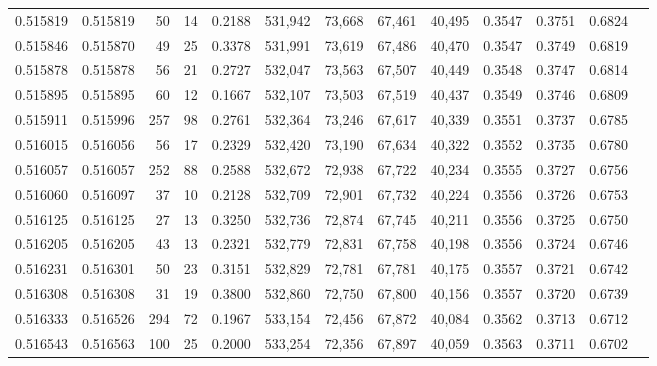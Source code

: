 \begin{tabular}{rrrrrrrrrrrrr}
0.515819 & 0.515819 &    50 &    14 &                                     0.2188 & 531,942 &  73,668 &  67,461 &  40,495 & 0.3547 & 0.3751 & 0.6824 \\
0.515846 & 0.515870 &    49 &    25 &                                     0.3378 & 531,991 &  73,619 &  67,486 &  40,470 & 0.3547 & 0.3749 & 0.6819 \\
0.515878 & 0.515878 &    56 &    21 &                                     0.2727 & 532,047 &  73,563 &  67,507 &  40,449 & 0.3548 & 0.3747 & 0.6814 \\
0.515895 & 0.515895 &    60 &    12 &                                     0.1667 & 532,107 &  73,503 &  67,519 &  40,437 & 0.3549 & 0.3746 & 0.6809 \\
0.515911 & 0.515996 &   257 &    98 &                                     0.2761 & 532,364 &  73,246 &  67,617 &  40,339 & 0.3551 & 0.3737 & 0.6785 \\
0.516015 & 0.516056 &    56 &    17 &                                     0.2329 & 532,420 &  73,190 &  67,634 &  40,322 & 0.3552 & 0.3735 & 0.6780 \\
0.516057 & 0.516057 &   252 &    88 &                                     0.2588 & 532,672 &  72,938 &  67,722 &  40,234 & 0.3555 & 0.3727 & 0.6756 \\
0.516060 & 0.516097 &    37 &    10 &                                     0.2128 & 532,709 &  72,901 &  67,732 &  40,224 & 0.3556 & 0.3726 & 0.6753 \\
0.516125 & 0.516125 &    27 &    13 &                                     0.3250 & 532,736 &  72,874 &  67,745 &  40,211 & 0.3556 & 0.3725 & 0.6750 \\
0.516205 & 0.516205 &    43 &    13 &                                     0.2321 & 532,779 &  72,831 &  67,758 &  40,198 & 0.3556 & 0.3724 & 0.6746 \\
0.516231 & 0.516301 &    50 &    23 &                                     0.3151 & 532,829 &  72,781 &  67,781 &  40,175 & 0.3557 & 0.3721 & 0.6742 \\
0.516308 & 0.516308 &    31 &    19 &                                     0.3800 & 532,860 &  72,750 &  67,800 &  40,156 & 0.3557 & 0.3720 & 0.6739 \\
0.516333 & 0.516526 &   294 &    72 &                                     0.1967 & 533,154 &  72,456 &  67,872 &  40,084 & 0.3562 & 0.3713 & 0.6712 \\
0.516543 & 0.516563 &   100 &    25 &                                     0.2000 & 533,254 &  72,356 &  67,897 &  40,059 & 0.3563 & 0.3711 & 0.6702 \\

\end{tabular}
